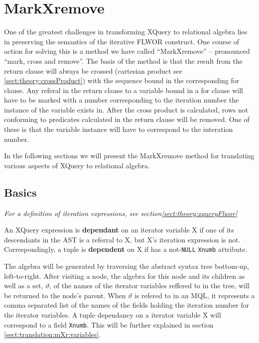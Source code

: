 \section{MarkXremove}
\label{sect:translation:mXr}

One of the greatest challenges in transforming XQuery to relational algebra lies in preserving the semantics of
the iterative FLWOR construct. One course of action for solving this is a method we have called ``MarkXremove'' --
pronounced ``mark, cross and remove''. The basis of the method is that the result from the \textsf{return} clause
will always be crossed (cartesian product see \ref{sect:theory:crossProduct}) with the sequence bound in the
corresponding \textsf{for} clause. Any referal in the \textsf{return} clause to a variable bound in a \textsf{for}
clause will have to be marked with a number corresponding to the iteration number the instance of the variable
exists in. After the cross product is calculated, rows not conforming to predicates calculated in the
\textsf{return} clause will be removed. One of these is that the variable instance will have to correspond to the
interation number.

In the following sections we will present the MarkXremove method for translating various aspects of XQuery to
relational algebra.

\subsection{Basics}
\label{sect:translation:mXr:basics}

\textit{For a definition of iteration expressions, see
section\ref{sect:theory:xqueryFlwor}} 

\begin{myDefinition}
An XQuery expression is \textbf{dependant} on an iterator variable \textsf{X}
if one of its descendants in the AST is a referral to \textsf{X}, but
\textsf{X}'s iteration expression is not. Correspondingly, a tuple is
\textbf{dependent} on \textsf{X} if has a not-\texttt{NULL} \texttt{Xnumb}
attribute.  
\end{myDefinition}

The algebra will be generated by traversing the abstract syntax tree bottom-up, left-to-right. After visiting a
node, the algebra for this node and its children as well as a set, $\vartheta$, of the names of the iterator
variables reffered to in the tree, will be returned to the node's parent. When $\vartheta$ is refered to in an MQL,
it represents a comma separated list of the names of the fields holding the iteration number for the iterator
variables. A tuple dependancy on a iterator variable \textsf{X} will correspond to a field \texttt{Xnumb}. This
will be further explained in section \ref{sect:translation:mXr:variables}.

